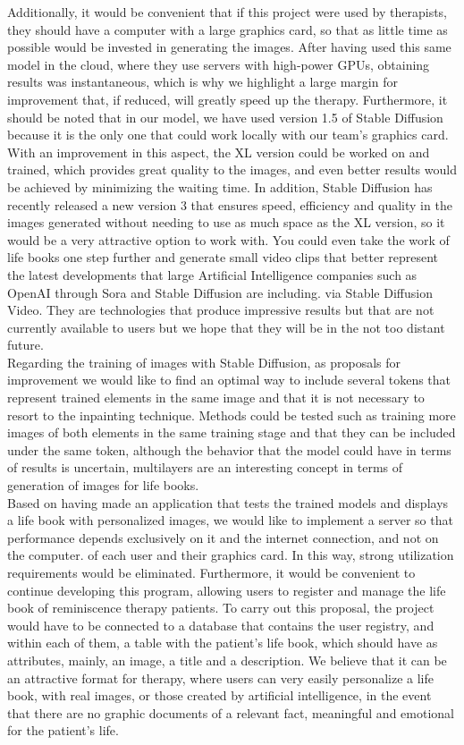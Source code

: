 Additionally, it would be convenient that if this project were used by therapists, they should have a computer with a large graphics card, so that as little time as possible would be invested in generating the images. After having used this same model in the cloud, where they use servers with high-power GPUs, obtaining results was instantaneous, which is why we highlight a large margin for improvement that, if reduced, will greatly speed up the therapy. Furthermore, it should be noted that in our model, we have used version 1.5 of Stable Diffusion because it is the only one that could work locally with our team's graphics card. With an improvement in this aspect, the XL version could be worked on and trained, which provides great quality to the images, and even better results would be achieved by minimizing the waiting time. In addition, Stable Diffusion has recently released a new version 3 that ensures speed, efficiency and quality in the images generated without needing to use as much space as the XL version, so it would be a very attractive option to work with. You could even take the work of life books one step further and generate small video clips that better represent the latest developments that large Artificial Intelligence companies such as OpenAI through Sora and Stable Diffusion are including. via Stable Diffusion Video. They are technologies that produce impressive results but that are not currently available to users but we hope that they will be in the not too distant future. \\

Regarding the training of images with Stable Diffusion, as proposals for improvement we would like to find an optimal way to include several tokens that represent trained elements in the same image and that it is not necessary to resort to the inpainting technique. Methods could be tested such as training more images of both elements in the same training stage and that they can be included under the same token, although the behavior that the model could have in terms of results is uncertain, multilayers are an interesting concept in terms of generation of images for life books. \\

Based on having made an application that tests the trained models and displays a life book with personalized images, we would like to implement a server so that performance depends exclusively on it and the internet connection, and not on the computer. of each user and their graphics card. In this way, strong utilization requirements would be eliminated. Furthermore, it would be convenient to continue developing this program, allowing users to register and manage the life book of reminiscence therapy patients. To carry out this proposal, the project would have to be connected to a database that contains the user registry, and within each of them, a table with the patient's life book, which should have as attributes, mainly, an image, a title and a description. We believe that it can be an attractive format for therapy, where users can very easily personalize a life book, with real images, or those created by artificial intelligence, in the event that there are no graphic documents of a relevant fact, meaningful and emotional for the patient's life.

